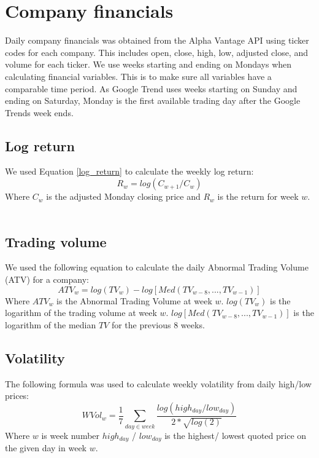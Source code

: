 \section{Company financials}
Daily company financials was obtained from the Alpha Vantage API using ticker codes for each company. This includes open, close, high, low, adjusted close, and volume for each ticker. We use weeks starting and ending on Mondays when calculating financial variables. This is to make sure all variables have a comparable time period. As Google Trend uses weeks starting on Sunday and ending on Saturday, Monday is the first available trading day after the Google Trends week ends. 
\subsection*{Log return}
We used Equation \eqref{log_return} to calculate the weekly log return:
\begin{equation}
   \label{log_return} 
   R_w = log (C_{w+1}/C_{w}) 
\end{equation}
Where $C_{w}$ is the adjusted Monday closing price and $R_{w}$ is the return for week $w$.
\\\\
\subsection*{Trading volume}
We used the following equation to calculate the daily Abnormal Trading Volume (ATV) for a company: 
\begin{equation}
   \label{abnormal_volume} 
   ATV_{w} = log(TV_{w}) - log[Med(TV_{w-8},...,TV_{w-1})] 
\end{equation}
   Where $ATV_w$ is the Abnormal Trading Volume at week $w$. $log(TV_{w})$ is the logarithm of the trading volume at week $w$. $log[Med(TV_{w-8},...,TV_{w-1})]$ is the logarithm of the median $TV$ for the previous 8 weeks.
\subsection*{Volatility}
The following formula was used to calculate weekly volatility from daily high/low prices:
\begin{equation}
   \label{w_volatility} 
   WVol_{w} = \frac{1}{7} \sum_{day\in week} \frac{log(high_{day}/low_{day})}{2*\sqrt{log(2)}} 
\end{equation}
Where $w$ is week number $high_{day}$ / $low_{day}$ is the highest/ lowest quoted price on the given day in week $w$.

